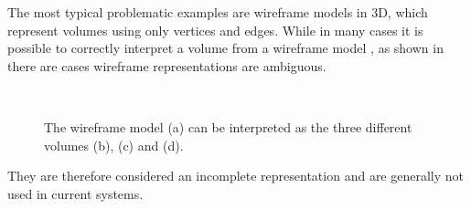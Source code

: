 The most typical problematic examples are wireframe models in 3D, which represent volumes using only vertices and edges.
While in many cases it is possible to correctly interpret a volume from a wireframe model \citep{Brewer86,Hanrahan82}, as shown in  there are cases wireframe representations are ambiguous.
\begin{figure}[tbp]
\centering
{}
\quad
{}
\\
\quad
{}
\caption[A wireframe model can have different interpretations]{The wireframe model (a) can be interpreted as the three different volumes (b), (c) and (d).}
\label{fig:wireframe}
\end{figure}
They are therefore considered an incomplete representation and are generally not used in current systems.

